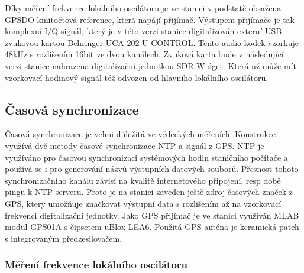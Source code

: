 \documentclass[12pt,a4paper,oneside]{article}
\begin{document}
Díky měření frekvence lokálního oscilátoru je ve stanici v podstatě obsažena GPSDO kmitočtová reference, která napájí přijímač. Výstupem přijímače je tak komplexní I/Q signál, který je v této verzi stanice digitalizován externí USB zvukovou kartou Behringer UCA 202 U-CONTROL. Tento audio kodek vzorkuje 48kHz s rozlišením 16bit ve dvou kanálech.  Zvuková karta bude v následující verzi stanice nahrazena digitalizační jednotkou SDR-Widget. Která už může mít vzorkovací hodinový signál též odvozen od hlavního lokálního oscilátoru. 

\subsection{Časová synchronizace}

Časová synchronizace je velmi dúležitá ve vědeckých měřeních. Konstrukce využívá dvě metody časové synchronizace NTP a signál z GPS.  NTP je využíváno pro časovou synchronizaci systémových hodin staničního počítače a používá se i pro generování názvů výstupních datových souborů. Přesnost tohoto synchronizačního kanálu závisí na kvalitě internetového připojení, resp době pingu k NTP serveru.  Proto je na stanici zaveden ještě zdroj časových značek z GPS, který umožňuje značkovat výstupní data s rozlišením až na vzorkovací frekvenci digitalizační jednotky. 
Jako GPS přijímač je ve stanici využíván MLAB modul GPS01A s čipsetem uBlox-LEA6. Použitá GPS anténa je keramická patch s integrovaným předzesilovačem.

\subsubsection{Měření frekvence lokálního oscilátoru}
\end{document}
